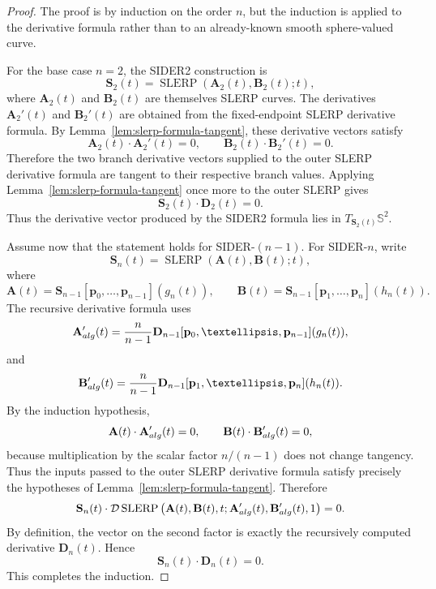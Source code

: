 \documentclass[10pt,a4paper]{amsart}
\newcommand{\bD}{\mathbf{D}}
\newcommand{\bp}{\mathbf{p}}
\newcommand{\slerp}{\operatorname{SLERP}}
\begin{document}
\begin{proof}
The proof is by induction on the order \(n\), but the induction is applied to the derivative formula rather than to an already-known smooth sphere-valued curve.

For the base case \(n=2\), the SIDER2 construction is
\[
        \mathbf{S}_2(t)=\slerp(\mathbf{A}_2(t),\mathbf{B}_2(t);t),
\]
where \(\mathbf{A}_2(t)\) and \(\mathbf{B}_2(t)\) are themselves SLERP curves.  The derivatives \(\mathbf{A}_2'(t)\) and \(\mathbf{B}_2'(t)\) are obtained from the fixed-endpoint SLERP derivative formula.  By Lemma~\ref{lem:slerp-formula-tangent}, these derivative vectors satisfy
\[
        \mathbf{A}_2(t)\cdot\mathbf{A}_2'(t)=0,
        \qquad
        \mathbf{B}_2(t)\cdot\mathbf{B}_2'(t)=0 .
\]
Therefore the two branch derivative vectors supplied to the outer SLERP derivative formula are tangent to their respective branch values.  Applying Lemma~\ref{lem:slerp-formula-tangent} once more to the outer SLERP gives
\[
        \mathbf{S}_2(t)\cdot\bD_2(t)=0 .
\]
Thus the derivative vector produced by the SIDER2 formula lies in \(T_{\mathbf{S}_2(t)}\mathbb{S}^2\).

Assume now that the statement holds for SIDER-\((n-1)\).  For SIDER-\(n\), write
\[
        \mathbf{S}_n(t)=\slerp(\mathbf{A}(t),\mathbf{B}(t);t),
\]
where
\[
        \mathbf{A}(t)
        =
        \mathbf{S}_{n-1}[\bp_0,\ldots,\bp_{n-1}](g_n(t)),
        \qquad
        \mathbf{B}(t)
        =
        \mathbf{S}_{n-1}[\bp_1,\ldots,\bp_n](h_n(t)).
\]
The recursive derivative formula uses
\[
        \mathbf{A}'_{\rm alg}(t)
        =
        \frac{n}{n-1}
        \bD_{n-1}[\bp_0,\ldots,\bp_{n-1}](g_n(t)),
\]
and
\[
        \mathbf{B}'_{\rm alg}(t)
        =
        \frac{n}{n-1}
        \bD_{n-1}[\bp_1,\ldots,\bp_n](h_n(t)).
\]
By the induction hypothesis,
\[
        \mathbf{A}(t)\cdot \mathbf{A}'_{\rm alg}(t)=0,
        \qquad
        \mathbf{B}(t)\cdot \mathbf{B}'_{\rm alg}(t)=0,
\]
because multiplication by the scalar factor \(n/(n-1)\) does not change tangency.  Thus the inputs passed to the outer SLERP derivative formula satisfy precisely the hypotheses of Lemma~\ref{lem:slerp-formula-tangent}.  Therefore
\[
        \mathbf{S}_n(t)\cdot
        \mathcal{D}\slerp
        \left(
        \mathbf{A}(t),\mathbf{B}(t),t;
        \mathbf{A}'_{\rm alg}(t),\mathbf{B}'_{\rm alg}(t),1
        \right)
        =
        0 .
\]
By definition, the vector on the second factor is exactly the recursively computed derivative \(\bD_n(t)\).  Hence
\[
        \mathbf{S}_n(t)\cdot\bD_n(t)=0 .
\]
This completes the induction.
\end{proof}
\end{document}
